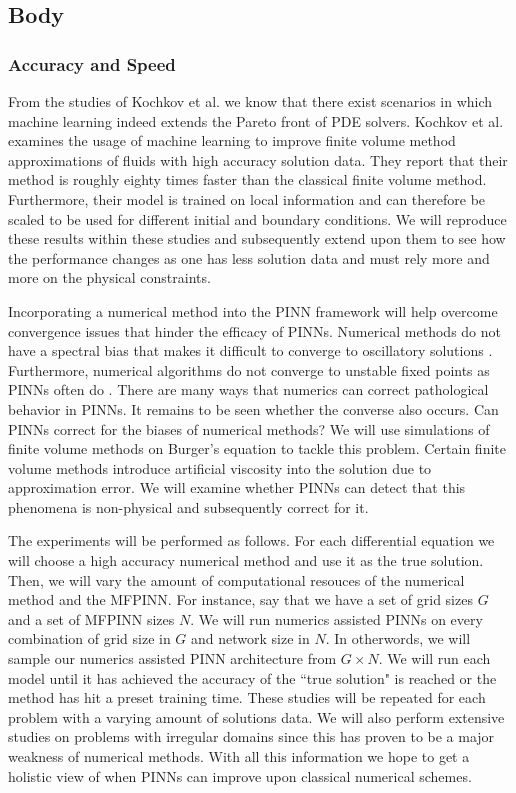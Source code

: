 \documentclass[12pt]{article}
\begin{document}
\subsection{Body}
\subsubsection*{Accuracy and Speed}

From the studies of Kochkov et al. \cite{fluidml} we know that there exist scenarios in which machine learning
indeed extends the Pareto front of PDE solvers. Kochkov et al. \cite{fluidml} examines the usage of machine learning 
to improve finite volume method approximations of fluids with high accuracy solution data. 
They report that their method is roughly eighty times faster than the classical finite volume method.
Furthermore, their model is trained on local information and can therefore be scaled to be used for different initial and boundary conditions.
We will reproduce these results within these studies and subsequently extend upon them to see how the performance changes as one has less solution data
and must rely more and more on the physical constraints.

Incorporating a numerical method into the PINN framework will help overcome convergence issues that hinder the efficacy of PINNs.
Numerical methods do not have a spectral bias that makes it difficult to converge to oscillatory solutions \cite{bias}. Furthermore,
numerical algorithms do not converge to unstable fixed points as PINNs often do \cite{fixedpts}. There are many ways that numerics can 
correct pathological behavior in PINNs. It remains to be seen whether the converse also occurs. Can PINNs correct for the
biases of numerical methods? We will use simulations of finite volume methods on Burger's equation to tackle this problem. Certain finite
volume methods introduce artificial viscosity into the solution due to approximation error. We will examine whether
PINNs can detect that this phenomena is non-physical and subsequently correct for it.

The experiments will be performed as follows. For each differential equation we will choose a high accuracy numerical method and use it
as the true solution. Then, we will vary the amount of computational resouces of the numerical method and the MFPINN. For instance, say
that we have a set of grid sizes $G$ and a set of MFPINN sizes $N$. We will run numerics assisted PINNs on every combination of grid size in $G$ 
and network size in $N$. In otherwords, we will sample our numerics assisted PINN architecture from $G \times N$. We will run each model until it
has achieved the accuracy of the ``true solution" is reached or the method has hit a preset training time. These studies will be repeated for each
problem with a varying amount of solutions data. We will also perform extensive studies on problems with irregular domains since this 
has proven to be a major weakness of numerical methods. With all this information we hope to get a holistic view of when PINNs can improve upon classical
numerical schemes.
\end{document}
